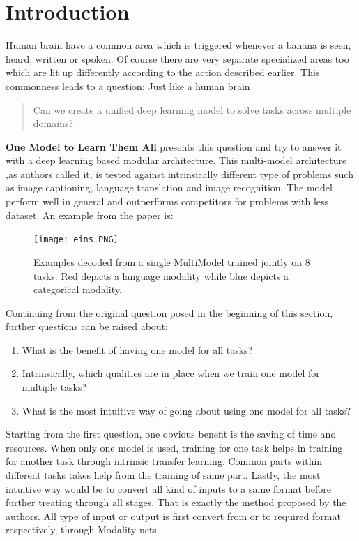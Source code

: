 \documentclass[12pt]{article}
\begin{document}
\section{Introduction}
Human brain have a common area which is triggered whenever a banana is seen, heard, written or spoken. Of course there are very separate specialized areas too which are lit up differently according to the action described earlier. This commonness leads to a question: Just like a human brain
\begin{quote}
 Can we create a unified deep learning model to solve tasks across multiple domains?
\end{quote}
\textbf{One Model to Learn Them All} presents this question and try to answer it with a deep learning based modular architecture. This multi-model architecture ,as authors called it, is tested against intrinsically different type of problems such as image captioning, language translation and image recognition. The model perform well in general and outperforms competitors for problems with less dataset. 
An example from the paper is:
\begin{center}
\begin{figure}[h]
  \centering
  \begin{minipage}[b]{1.0\textwidth}
    \texttt{[image: eins.PNG]}
    \caption{Examples decoded from a single MultiModel trained jointly on 8 tasks. Red depicts a
language modality while blue depicts a categorical modality. \cite{KaiserGSVPJU17}}
  \end{minipage}
\end{figure}
\end{center}
Continuing from the original question posed in the beginning of this section, further questions can be raised about:\\
\begin{enumerate}
\item What is the benefit of having one model for all tasks?
\item Intrinsically, which qualities are in place when we train one model for multiple tasks? 
\item What is the most intuitive way of going about using one model for all tasks?
\end{enumerate}
Starting from the first question, one obvious benefit is the saving of time and resources. When only one model is used, training for one task helps in training for another task through intrinsic transfer learning.
Common parts within different tasks takes help from the training of same part.
Lastly, the most intuitive way would be to convert all kind of inputs to a same format before further treating through all stages. That is exactly the method proposed by the authors. All type of input or output is first convert from or to required format respectively, through Modality nets.
\end{document}

